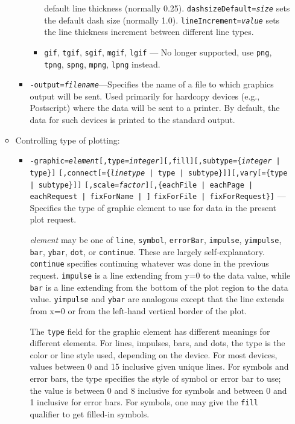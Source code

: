 \begin{itemize}
\begin{itemize}
\begin{itemize}
\begin{itemize}
        default line thickness (normally 0.25).  {\tt dashsizeDefault={\em size}} sets the default dash size
        (normally 1.0).  {\tt lineIncrement={\em value}} sets the line thickness increment between different
        line types.
        \item {\tt gif}, {\tt tgif}, {\tt sgif}, {\tt mgif}, {\tt lgif} --- No longer supported, use {\tt png}, 
        {\tt tpng}, {\tt spng}, {\tt mpng}, {\tt lpng} instead.
        \end{itemize}
  \item {\tt -output={\em filename}}---Specifies the name of a file to which graphics output will be sent.
        Used primarily for hardcopy devices (e.g., Postscript) where the data will be sent to a printer.
        By default, the data for such devices is printed to the standard output.
  \end{itemize}
\item Controlling type of plotting:
  \begin{itemize}

  \item {\tt -graphic={\em element}[,type={\em integer}][,fill][,subtype=\{{\em integer} | type\}]}
        {\tt [,connect[=\{{\em linetype} | type | subtype\}]][,vary[=\{type | subtype\}]]}
        {\tt [,scale={\em factor}][,\{eachFile | eachPage | eachRequest | fixForName | ]}
	{\tt fixForFile | fixForRequest\}]} ---
        Specifies the type of graphic element to use for data in the present plot request.  

{\em element} may be one of {\tt line}, {\tt symbol}, {\tt errorBar}, {\tt impulse}, {\tt yimpulse}, {\tt
bar}, {\tt ybar}, {\tt dot}, or {\tt continue}.  These are largely self-explanatory.  {\tt continue}
specifies continuing whatever was done in the previous request.  {\tt impulse} is a line extending from
y=0 to the data value, while {\tt bar} is a line extending from the bottom of the plot region to the data
value.  {\tt yimpulse} and {\tt ybar} are analogous except that the line extends from x=0 or from the
left-hand vertical border of the plot.

The {\tt type} field for the graphic element has different meanings for different elements.  For
lines, impulses, bars, and dots, the type is the color or line style used, depending on the device.
For most devices, values between 0 and 15 inclusive given unique lines.  For symbols and error bars,
the type specifies the style of symbol or error bar to use; the value is between 0 and 8 inclusive
for symbols and between 0 and 1 inclusive for error bars.  For symbols, one may give the {\tt fill}
qualifier to get filled-in symbols.


\end{itemize}
\end{itemize}
\end{itemize}
